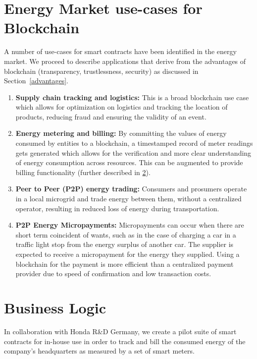 \section{Energy Market use-cases for Blockchain}

A number of use-cases for smart contracts have been identified in the energy market. We proceed to describe applications that derive from the advantages of blockchain (transparency, trustlessness, security) as discussed in Section~\ref{advantages}.

\begin{enumerate}
    \item \textbf{Supply chain tracking and logistics:} This is a broad blockchain use case which allows for optimization on logistics and tracking the location of products, reducing fraud and ensuring the validity of an event.
    \item \textbf{Energy metering and billing:} By committing the values of energy consumed by entities to a blockchain, a timestamped record of meter readings gets generated which allows for the verification and more clear understanding of energy consumption across resources. This can be augmented to provide billing functionality (further described in \ref{business-logic}).
    \item \textbf{Peer to Peer (P2P) energy trading:} Consumers and prosumers operate in a local microgrid and trade energy between them, without a centralized operator, resulting in reduced loss of energy during transportation.
    \item \textbf{P2P Energy Micropayments:} Micropayments can occur when there are short term coincident of wants, such as in the case of charging a car in a traffic light stop from the energy surplus of another car. The supplier is expected to receive a micropayment for the energy they supplied. Using a blockchain for the payment is more efficient than a centralized payment provider due to speed of confirmation and low transaction costs.
\end{enumerate}

\section{Business Logic} \label{business-logic}

In collaboration with Honda R\&D Germany, we create a pilot suite of smart contracts for in-house use in order to track and bill the consumed energy of the company's headquarters as measured by a set of smart meters. 


